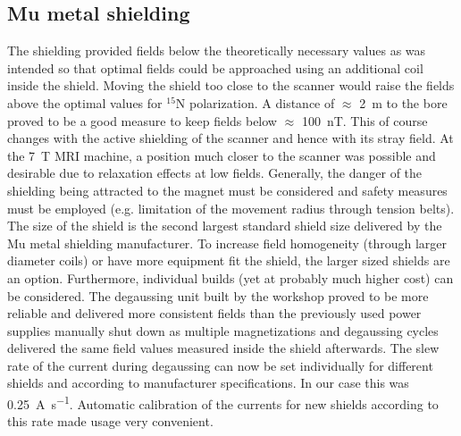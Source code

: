         \subsection{Mu metal shielding}
            The shielding provided fields below the theoretically necessary values as was intended so that optimal fields could be approached using an additional coil inside the shield. Moving the shield too close to the scanner would raise the fields above the optimal values for $^{15}$N polarization. A distance of $\approx$ \SI{2}{\meter} to the bore proved to be a good measure to keep fields below $\approx$ \SI{100}{\nano\tesla}. This of course changes with the active shielding of the scanner and hence with its stray field. At the \SI{7}{\tesla} MRI machine, a position much closer to the scanner was possible and desirable due to relaxation effects at low fields. Generally, the danger of the shielding being attracted to the magnet must be considered and safety measures must be employed (e.g. limitation of the movement radius through tension belts). The size of the shield is the second largest standard shield size delivered by the Mu metal shielding manufacturer. To increase field homogeneity (through larger diameter coils) or have more equipment fit the shield, the larger sized shields are an option. Furthermore, individual builds (yet at probably much higher cost) can be considered.
            The degaussing unit built by the workshop proved to be more reliable and delivered more consistent fields than the previously used power supplies manually shut down as multiple magnetizations and degaussing cycles delivered the same field values measured inside the shield afterwards. The slew rate of the current during degaussing can now be set individually for different shields and according to manufacturer specifications. In our case this was \SI{0.25}{\ampere\per\second}. Automatic calibration of the currents for new shields according to this rate made usage very convenient.
